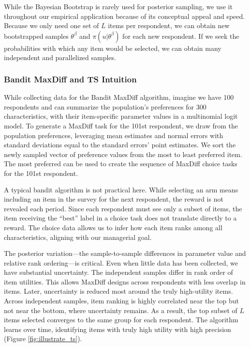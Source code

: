 \documentclass[nonblindrev]{informs3}
\newcommand{\ts}{\textbf{TS} }
\newcommand{\numperset}{L}
\begin{document}
While the Bayesian Bootstrap is rarely used for posterior sampling, we use it throughout our empirical application because of its conceptual appeal and speed. Because we only need one set of $\numperset$ items per respondent, we can obtain new bootstrapped samples $\theta^{\beta}$ and $\pi(u|\theta^\beta)$ for each new respondent. If we seek the probabilities with which any item would be selected, we can obtain many independent and parallelized samples. 

\subsubsection{Bandit MaxDiff and \ts Intuition }

While collecting data for the Bandit MaxDiff algorithm, imagine we have 100 respondents and can summarize the population's preferences for 300 characteristics, with their item-specific parameter values in a multinomial logit model. To generate a MaxDiff task for the 101st respondent, we draw from the population preferences, leveraging mean estimates and normal errors with standard deviations equal to the standard errors' point estimates. We sort the newly sampled vector of preference values from the most to least preferred item. The most preferred can be used to create the sequence of MaxDiff choice tasks for the 101st respondent.

A typical bandit algorithm is not practical here. While selecting an arm means including an item in the survey for the next respondent, the reward is not revealed each period. Since each respondent must see only a subset of items, the item receiving the ``best'' label in a choice task does not translate directly to a reward. The choice data allows us to infer how each item ranks among all characteristics, aligning with our managerial goal.

The posterior variation---the sample-to-sample differences in parameter value and relative rank ordering---is critical. Even when little data has been collected, we have substantial uncertainty. The independent samples differ in rank order of item utilities. This allows MaxDiff designs across respondents with less overlap in items. Later, uncertainty is reduced most around the truly high-utility items. Across independent samples, item ranking is highly correlated near the top but not near the bottom, where uncertainty remains. As a result, the top subset of $\numperset$ items selected converges to the same group for each respondent. The algorithm learns over time, identifying items with truly high utility with high precision (Figure \ref{fig:illustrate_ts}). 
\end{document}

